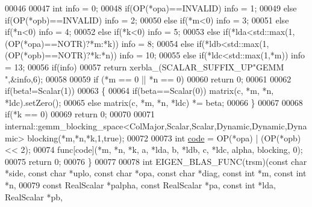 \begin{DoxyCode}
00046 
00047   \textcolor{keywordtype}{int} info = 0;
00048   \textcolor{keywordflow}{if}(OP(*opa)==INVALID)                                               info = 1;
00049   \textcolor{keywordflow}{else} \textcolor{keywordflow}{if}(OP(*opb)==INVALID)                                          info = 2;
00050   \textcolor{keywordflow}{else} \textcolor{keywordflow}{if}(*m<0)                                                       info = 3;
00051   \textcolor{keywordflow}{else} \textcolor{keywordflow}{if}(*n<0)                                                       info = 4;
00052   \textcolor{keywordflow}{else} \textcolor{keywordflow}{if}(*k<0)                                                       info = 5;
00053   \textcolor{keywordflow}{else} \textcolor{keywordflow}{if}(*lda<std::max(1,(OP(*opa)==NOTR)?*m:*k))                    info = 8;
00054   \textcolor{keywordflow}{else} \textcolor{keywordflow}{if}(*ldb<std::max(1,(OP(*opb)==NOTR)?*k:*n))                    info = 10;
00055   \textcolor{keywordflow}{else} \textcolor{keywordflow}{if}(*ldc<std::max(1,*m))                                        info = 13;
00056   \textcolor{keywordflow}{if}(info)
00057     \textcolor{keywordflow}{return} xerbla\_(SCALAR\_SUFFIX\_UP\textcolor{stringliteral}{"GEMM "},&info,6);
00058 
00059   \textcolor{keywordflow}{if} (*m == 0 || *n == 0)
00060     \textcolor{keywordflow}{return} 0;
00061 
00062   \textcolor{keywordflow}{if}(beta!=Scalar(1))
00063   \{
00064     \textcolor{keywordflow}{if}(beta==Scalar(0)) matrix(c, *m, *n, *ldc).setZero();
00065     \textcolor{keywordflow}{else}                matrix(c, *m, *n, *ldc) *= beta;
00066   \}
00067 
00068   \textcolor{keywordflow}{if}(*k == 0)
00069     \textcolor{keywordflow}{return} 0;
00070 
00071   internal::gemm\_blocking\_space<ColMajor,Scalar,Scalar,Dynamic,Dynamic,Dynamic> blocking(*m,*n,*k,1,\textcolor{keyword}{true});
00072 
00073   \textcolor{keywordtype}{int} \hyperlink{structcode}{code} = OP(*opa) | (OP(*opb) << 2);
00074   func[code](*m, *n, *k, a, *lda, b, *ldb, c, *ldc, alpha, blocking, 0);
00075   \textcolor{keywordflow}{return} 0;
00076 \}
00077 
00078 \textcolor{keywordtype}{int} EIGEN\_BLAS\_FUNC(trsm)(\textcolor{keyword}{const} \textcolor{keywordtype}{char} *side, \textcolor{keyword}{const} \textcolor{keywordtype}{char} *uplo, \textcolor{keyword}{const} \textcolor{keywordtype}{char} *opa, \textcolor{keyword}{const} \textcolor{keywordtype}{char} *diag, \textcolor{keyword}{const} \textcolor{keywordtype}{int} 
      *m, \textcolor{keyword}{const} \textcolor{keywordtype}{int} *n,
00079                           \textcolor{keyword}{const} RealScalar *palpha,  \textcolor{keyword}{const} RealScalar *pa, \textcolor{keyword}{const} \textcolor{keywordtype}{int} *lda, RealScalar *pb, \textcolor{keyword}{
}
\end{DoxyCode}
